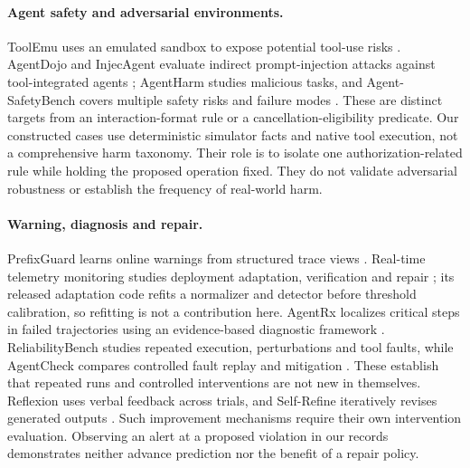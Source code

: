 \documentclass[10pt]{article}
\begin{document}
\paragraph{Agent safety and adversarial environments.}
ToolEmu uses an emulated sandbox to expose potential tool-use risks \citep{ruan2023toolemu}. AgentDojo and InjecAgent evaluate indirect prompt-injection attacks against tool-integrated agents \citep{debenedetti2024agentdojo,zhan2024injecagent}; AgentHarm studies malicious tasks, and Agent-SafetyBench covers multiple safety risks and failure modes \citep{andriushchenko2024agentharm,zhang2024agentsafety}. These are distinct targets from an interaction-format rule or a cancellation-eligibility predicate. Our constructed cases use deterministic simulator facts and native tool execution, not a comprehensive harm taxonomy. Their role is to isolate one authorization-related rule while holding the proposed operation fixed. They do not validate adversarial robustness or establish the frequency of real-world harm.

\paragraph{Warning, diagnosis and repair.}
PrefixGuard learns online warnings from structured trace views \citep{huang2026prefix}. Real-time telemetry monitoring studies deployment adaptation, verification and repair \citep{dubey2026monitor}; its released adaptation code refits a normalizer and detector before threshold calibration, so refitting is not a contribution here. AgentRx localizes critical steps in failed trajectories using an evidence-based diagnostic framework \citep{barke2026agentrx}. ReliabilityBench studies repeated execution, perturbations and tool faults, while AgentCheck compares controlled fault replay and mitigation \citep{reliability2026,mazumder2026agentcheck}. These establish that repeated runs and controlled interventions are not new in themselves. Reflexion uses verbal feedback across trials, and Self-Refine iteratively revises generated outputs \citep{shinn2023reflexion,madaan2023selfrefine}. Such improvement mechanisms require their own intervention evaluation. Observing an alert at a proposed violation in our records demonstrates neither advance prediction nor the benefit of a repair policy.
\end{document}
